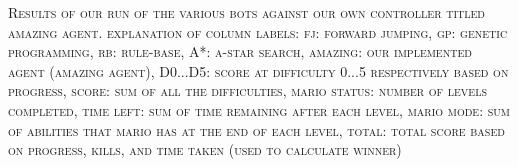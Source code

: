 \documentclass[12pt]{article}
\begin{document}
\begin{center}
\begin{table}[h]
\caption*{\footnotesize Controller Scores}
\end{table}
\vspace{-3ex}
\textsc{\scriptsize Results of our run of the various bots against our own controller titled amazing agent. explanation of column labels: fj: forward jumping, gp: genetic programming, rb: rule-base, A*: a-star search, amazing: our implemented agent (amazing agent), D0...D5: score at difficulty 0...5 respectively based on progress, score: sum of all the difficulties, mario status: number of levels completed, time left: sum of time remaining after each level, mario mode: sum of abilities that mario has at the end of each level, total: total score based on progress, kills, and time taken (used to calculate winner)}
\end{center}
\end{document}
